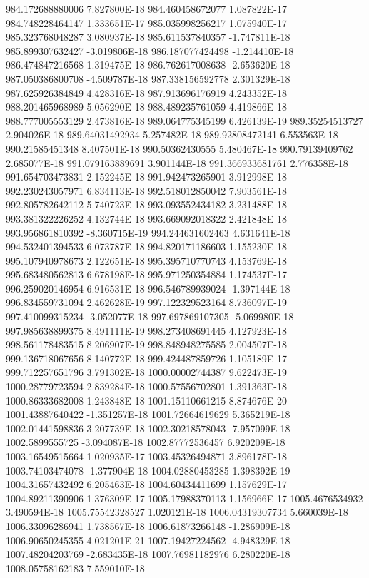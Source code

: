 984.172688880006  7.827800E-18
984.460458672077  1.087822E-17
984.748228464147  1.333651E-17
985.035998256217  1.075940E-17
985.323768048287  3.080937E-18
985.611537840357  -1.747811E-18
985.899307632427  -3.019806E-18
986.187077424498  -1.214410E-18
986.474847216568  1.319475E-18
986.762617008638  -2.653620E-18
987.050386800708  -4.509787E-18
987.338156592778  2.301329E-18
987.625926384849  4.428316E-18
987.913696176919  4.243352E-18
988.201465968989  5.056290E-18
988.489235761059  4.419866E-18
988.777005553129  2.473816E-18
989.064775345199  6.426139E-19
989.35254513727  2.904026E-18
989.64031492934  5.257482E-18
989.92808472141  6.553563E-18
990.21585451348  8.407501E-18
990.50362430555  5.480467E-18
990.79139409762  2.685077E-18
991.079163889691  3.901144E-18
991.366933681761  2.776358E-18
991.654703473831  2.152245E-18
991.942473265901  3.912998E-18
992.230243057971  6.834113E-18
992.518012850042  7.903561E-18
992.805782642112  5.740723E-18
993.093552434182  3.231488E-18
993.381322226252  4.132744E-18
993.669092018322  2.421848E-18
993.956861810392  -8.360715E-19
994.244631602463  4.631641E-18
994.532401394533  6.073787E-18
994.820171186603  1.155230E-18
995.107940978673  2.122651E-18
995.395710770743  4.153769E-18
995.683480562813  6.678198E-18
995.971250354884  1.174537E-17
996.259020146954  6.916531E-18
996.546789939024  -1.397144E-18
996.834559731094  2.462628E-19
997.122329523164  8.736097E-19
997.410099315234  -3.052077E-18
997.697869107305  -5.069980E-18
997.985638899375  8.491111E-19
998.273408691445  4.127923E-18
998.561178483515  8.206907E-19
998.848948275585  2.004507E-18
999.136718067656  8.140772E-18
999.424487859726  1.105189E-17
999.712257651796  3.791302E-18
1000.00002744387  9.622473E-19
1000.28779723594  2.839284E-18
1000.57556702801  1.391363E-18
1000.86333682008  1.243848E-18
1001.15110661215  8.874676E-20
1001.43887640422  -1.351257E-18
1001.72664619629  5.365219E-18
1002.01441598836  3.207739E-18
1002.30218578043  -7.957099E-18
1002.5899555725  -3.094087E-18
1002.87772536457  6.920209E-18
1003.16549515664  1.020935E-17
1003.45326494871  3.896178E-18
1003.74103474078  -1.377904E-18
1004.02880453285  1.398392E-19
1004.31657432492  6.205463E-18
1004.60434411699  1.157629E-17
1004.89211390906  1.376309E-17
1005.17988370113  1.156966E-17
1005.4676534932  3.490594E-18
1005.75542328527  1.020121E-18
1006.04319307734  5.660039E-18
1006.33096286941  1.738567E-18
1006.61873266148  -1.286909E-18
1006.90650245355  4.021201E-21
1007.19427224562  -4.948329E-18
1007.48204203769  -2.683435E-18
1007.76981182976  6.280220E-18
1008.05758162183  7.559010E-18
